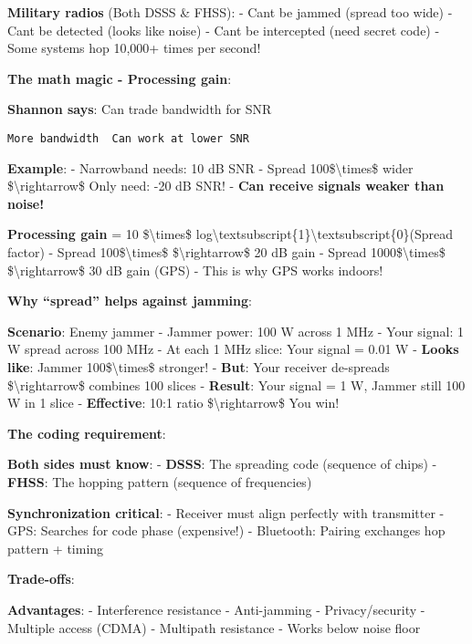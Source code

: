 \textbf{Military radios} (Both DSSS \& FHSS): - Can\textquotesingle t be
jammed (spread too wide) - Can\textquotesingle t be detected (looks like
noise) - Can\textquotesingle t be intercepted (need secret code) - Some
systems hop 10,000+ times per second!

\textbf{The math magic - Processing gain}:

\textbf{Shannon says}: Can trade bandwidth for SNR

\begin{verbatim}
More bandwidth  Can work at lower SNR
\end{verbatim}

\textbf{Example}: - Narrowband needs: 10 dB SNR - Spread
100\$\textbackslash times\$ wider \$\textbackslash rightarrow\$ Only
need: -20 dB SNR! - \textbf{Can receive signals weaker than noise!}

\textbf{Processing gain} = 10 \$\textbackslash times\$
log\textbackslash textsubscript\{1\}\textbackslash textsubscript\{0\}(Spread
factor) - Spread 100\$\textbackslash times\$
\$\textbackslash rightarrow\$ 20 dB gain - Spread
1000\$\textbackslash times\$ \$\textbackslash rightarrow\$ 30 dB gain
(GPS) - This is why GPS works indoors!

\textbf{Why ``spread'' helps against jamming}:

\textbf{Scenario}: Enemy jammer - Jammer power: 100 W across 1 MHz -
Your signal: 1 W spread across 100 MHz - At each 1 MHz slice: Your
signal = 0.01 W - \textbf{Looks like}: Jammer
100\$\textbackslash times\$ stronger! - \textbf{But}: Your receiver
de-spreads \$\textbackslash rightarrow\$ combines 100 slices -
\textbf{Result}: Your signal = 1 W, Jammer still 100 W in 1 slice -
\textbf{Effective}: 10:1 ratio \$\textbackslash rightarrow\$ You win!

\textbf{The coding requirement}:

\textbf{Both sides must know}: - \textbf{DSSS}: The spreading code
(sequence of chips) - \textbf{FHSS}: The hopping pattern (sequence of
frequencies)

\textbf{Synchronization critical}: - Receiver must align perfectly with
transmitter - GPS: Searches for code phase (expensive!) - Bluetooth:
Pairing exchanges hop pattern + timing

\textbf{Trade-offs}:

\textbf{Advantages}: - Interference resistance - Anti-jamming -
Privacy/security - Multiple access (CDMA) - Multipath resistance - Works
below noise floor


